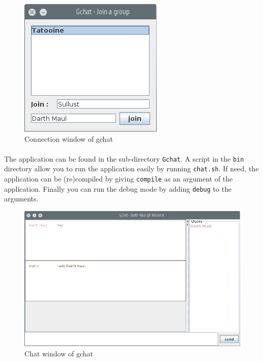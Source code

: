 \begin{figure}[h]
    \begin{center}
        \includegraphics[scale=0.6]{figures/gchat_connection.png}
    \end{center}
    \caption{Connection window of gchat}
    \label{fig:gchat_connect}
\end{figure}

\paragraph{}{
    The application can be found in the sub-directory \texttt{Gchat}. 
 A script in the \texttt{bin} directory allow you to run the application easily
 by running \texttt{chat.sh}. If need, the application can be (re)compiled by 
 giving \texttt{compile} as an argument of the application. Finally you can run
 the debug mode by adding \texttt{debug} to the arguments.
}

\begin{figure}[h]
    \begin{center}
        \includegraphics[scale=0.4]{figures/gchat_chat.png}
    \end{center}
    \caption{Chat window of gchat}
    \label{fig:gchat_connectchat}
\end{figure}


